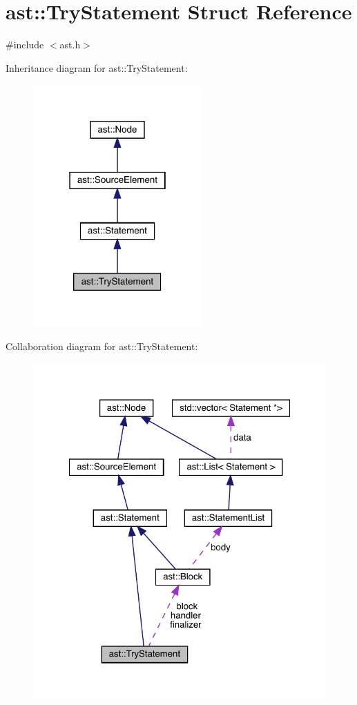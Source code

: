 \hypertarget{structast_1_1_try_statement}{}\section{ast\+:\+:Try\+Statement Struct Reference}
\label{structast_1_1_try_statement}


{\ttfamily \#include $<$ast.\+h$>$}



Inheritance diagram for ast\+:\+:Try\+Statement\+:\nopagebreak
\begin{figure}[H]
\begin{center}
\leavevmode
\includegraphics[width=183pt]{structast_1_1_try_statement__inherit__graph}
\end{center}
\end{figure}


Collaboration diagram for ast\+:\+:Try\+Statement\+:\nopagebreak
\begin{figure}[H]
\begin{center}
\leavevmode
\includegraphics[width=322pt]{structast_1_1_try_statement__coll__graph}
\end{center}
\end{figure}
